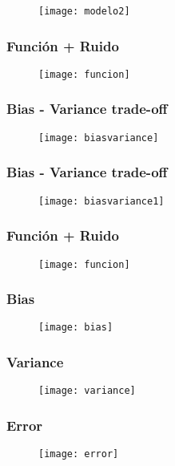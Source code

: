 \documentclass[14pt]{beamer}
\begin{document}
\begin{frame}
  \begin{figure}
    \centering
    \texttt{[image: modelo2]}
   \end{figure}
\end{frame}
\begin{frame}
\frametitle{Función + Ruido}
  \begin{figure}
    \centering
    \texttt{[image: funcion]}
   \end{figure}
\end{frame}
\begin{frame}
\frametitle{Bias - Variance trade-off}
  \begin{figure}
    \centering
    \texttt{[image: biasvariance]}
   \end{figure}
\end{frame}
\begin{frame}
\frametitle{Bias - Variance trade-off}
  \begin{figure}
    \centering
    \texttt{[image: biasvariance1]}
   \end{figure}
\end{frame}
\begin{frame}
\frametitle{Función + Ruido}
  \begin{figure}
    \centering
    \texttt{[image: funcion]}
   \end{figure}
\end{frame}
\begin{frame}
\frametitle{Bias}
  \begin{figure}
    \centering
    \texttt{[image: bias]}
   \end{figure}
\end{frame}
\begin{frame}
\frametitle{Variance}
  \begin{figure}
    \centering
    \texttt{[image: variance]}
   \end{figure}
\end{frame}
\begin{frame}
\frametitle{Error}
  \begin{figure}
    \centering
    \texttt{[image: error]}
   \end{figure}
\end{frame}
\end{document}
